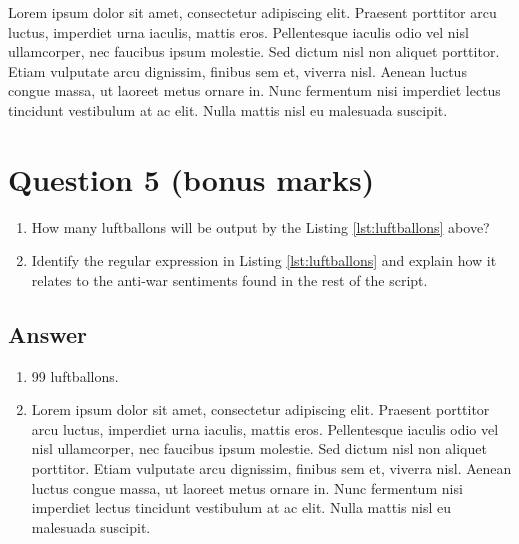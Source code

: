 \documentclass[
	12pt, %
]{fphw}
\begin{document}
Lorem ipsum dolor sit amet, consectetur adipiscing elit. Praesent porttitor arcu luctus, imperdiet urna iaculis, mattis eros. Pellentesque iaculis odio vel nisl ullamcorper, nec faucibus ipsum molestie. Sed dictum nisl non aliquet porttitor. Etiam vulputate arcu dignissim, finibus sem et, viverra nisl. Aenean luctus congue massa, ut laoreet metus ornare in. Nunc fermentum nisi imperdiet lectus tincidunt vestibulum at ac elit. Nulla mattis nisl eu malesuada suscipit.


\section*{Question 5 (bonus marks)}

\begin{problem}
	
	
	\begin{enumerate}
		\item How many luftballons will be output by the Listing \ref{lst:luftballons} above?
		\item Identify the regular expression in Listing \ref{lst:luftballons} and explain how it relates to the anti-war sentiments found in the rest of the script.
	\end{enumerate}

\end{problem}


\subsection*{Answer}

\begin{enumerate}
	\item 99 luftballons.
	\item Lorem ipsum dolor sit amet, consectetur adipiscing elit. Praesent porttitor arcu luctus, imperdiet urna iaculis, mattis eros. Pellentesque iaculis odio vel nisl ullamcorper, nec faucibus ipsum molestie. Sed dictum nisl non aliquet porttitor. Etiam vulputate arcu dignissim, finibus sem et, viverra nisl. Aenean luctus congue massa, ut laoreet metus ornare in. Nunc fermentum nisi imperdiet lectus tincidunt vestibulum at ac elit. Nulla mattis nisl eu malesuada suscipit.
\end{enumerate}

\end{document}
